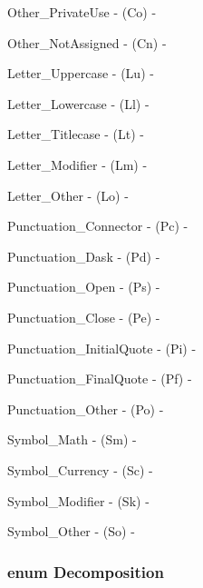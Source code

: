 \begin{DoxyItemize}
\item {\ttfamily Other\-\_\-\-Private\-Use} -\/ (Co) -\/


\item {\ttfamily Other\-\_\-\-Not\-Assigned} -\/ (Cn) -\/


\item {\ttfamily Letter\-\_\-\-Uppercase} -\/ (Lu) -\/


\item {\ttfamily Letter\-\_\-\-Lowercase} -\/ (Ll) -\/


\item {\ttfamily Letter\-\_\-\-Titlecase} -\/ (Lt) -\/


\item {\ttfamily Letter\-\_\-\-Modifier} -\/ (Lm) -\/


\item {\ttfamily Letter\-\_\-\-Other} -\/ (Lo) -\/


\item {\ttfamily Punctuation\-\_\-\-Connector} -\/ (Pc) -\/


\item {\ttfamily Punctuation\-\_\-\-Dask} -\/ (Pd) -\/


\item {\ttfamily Punctuation\-\_\-\-Open} -\/ (Ps) -\/


\item {\ttfamily Punctuation\-\_\-\-Close} -\/ (Pe) -\/


\item {\ttfamily Punctuation\-\_\-\-Initial\-Quote} -\/ (Pi) -\/


\item {\ttfamily Punctuation\-\_\-\-Final\-Quote} -\/ (Pf) -\/


\item {\ttfamily Punctuation\-\_\-\-Other} -\/ (Po) -\/


\item {\ttfamily Symbol\-\_\-\-Math} -\/ (Sm) -\/


\item {\ttfamily Symbol\-\_\-\-Currency} -\/ (Sc) -\/


\item {\ttfamily Symbol\-\_\-\-Modifier} -\/ (Sk) -\/


\item {\ttfamily Symbol\-\_\-\-Other} -\/ (So) -\/


\end{DoxyItemize}\hypertarget{class_q_char_a9416cff6b11eb874218733dac5b6ea96}{
\subsubsection[{Decomposition}]{\setlength{\rightskip}{0pt plus 5cm}enum {\bf Decomposition}}}\label{class_q_char_a9416cff6b11eb874218733dac5b6ea96}
